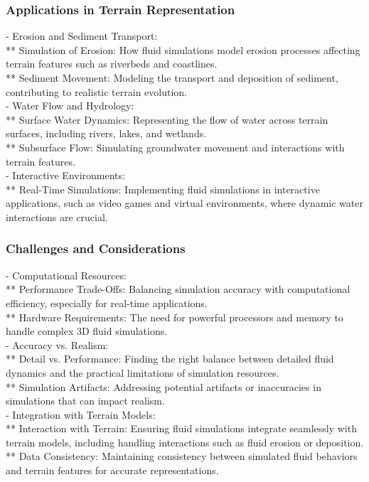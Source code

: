 \subsubsection{Applications in Terrain Representation}
- Erosion and Sediment Transport: \\
** Simulation of Erosion: How fluid simulations model erosion processes affecting terrain features such as riverbeds and coastlines. \\
** Sediment Movement: Modeling the transport and deposition of sediment, contributing to realistic terrain evolution. \\
- Water Flow and Hydrology: \\
** Surface Water Dynamics: Representing the flow of water across terrain surfaces, including rivers, lakes, and wetlands. \\
** Subsurface Flow: Simulating groundwater movement and interactions with terrain features. \\
- Interactive Environments: \\
** Real-Time Simulations: Implementing fluid simulations in interactive applications, such as video games and virtual environments, where dynamic water interactions are crucial. 

\subsubsection{Challenges and Considerations}
- Computational Resources: \\
** Performance Trade-Offs: Balancing simulation accuracy with computational efficiency, especially for real-time applications. \\
** Hardware Requirements: The need for powerful processors and memory to handle complex 3D fluid simulations. \\
- Accuracy vs. Realism: \\
** Detail vs. Performance: Finding the right balance between detailed fluid dynamics and the practical limitations of simulation resources. \\
** Simulation Artifacts: Addressing potential artifacts or inaccuracies in simulations that can impact realism. \\
- Integration with Terrain Models: \\
** Interaction with Terrain: Ensuring fluid simulations integrate seamlessly with terrain models, including handling interactions such as fluid erosion or deposition. \\
** Data Consistency: Maintaining consistency between simulated fluid behaviors and terrain features for accurate representations. 

